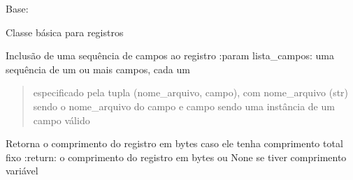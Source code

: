 \documentclass[letterpaper,10pt,brazil]{sphinxmanual}
\begin{document}
\begin{fulllineitems}
\label{\detokenize{estrutarq.registro:estrutarq.registro.registro_comum.RegistroBasico}}
\pysigstartsignatures
{}
\pysigstopsignatures
\sphinxAtStartPar
Base: {\hyperref[\detokenize{estrutarq.dado:estrutarq.dado.DadoBasico}]{}}

\sphinxAtStartPar
Classe básica para registros

\sphinxAtStartPar
{}

\begin{fulllineitems}
\label{\detokenize{estrutarq.registro:estrutarq.registro.registro_comum.RegistroBasico.adicione_campos}}
\pysigstartsignatures
{}
\pysigstopsignatures
\sphinxAtStartPar
Inclusão de uma sequência de campos ao registro
:param lista\_campos: uma sequência de um ou mais campos, cada um
\begin{quote}

\sphinxAtStartPar
especificado pela tupla (nome\_arquivo, campo), com
nome\_arquivo (str) sendo o nome\_arquivo do campo e campo sendo
uma instância de um campo válido
\end{quote}

\end{fulllineitems}


\begin{fulllineitems}
\label{\detokenize{estrutarq.registro:estrutarq.registro.registro_comum.RegistroBasico.comprimento}}
\pysigstartsignatures
{}
\pysigstopsignatures
\sphinxAtStartPar
Retorna o comprimento do registro em bytes caso ele tenha comprimento
total fixo
:return: o comprimento do registro em bytes ou None se tiver
comprimento variável


\end{fulllineitems}
\end{fulllineitems}
\end{document}
